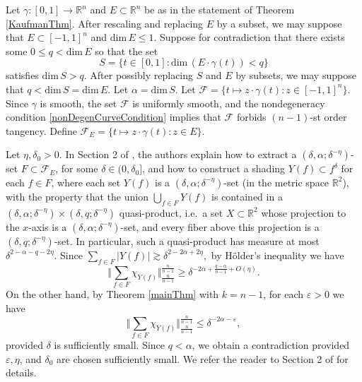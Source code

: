 \documentclass[letterpaper, reqno,11pt]{article}
\numberwithin{equation}{section}
\renewcommand{\dim}{\mathrm{dim}\,}
\newcommand{\RR}{\mathbb{R}}
\newcommand{\eps}{\varepsilon}
\numberwithin{thm}{section}
\theoremstyle{remark}
\begin{document}
Let $\gamma\colon[0,1]\to\RR^n$ and $E\subset\RR^n$ be as in the statement of Theorem \ref{KaufmanThm}. After rescaling and replacing $E$ by a subset, we may suppose that $E\subset[-1,1]^n$ and $\dim E\leq 1$. Suppose for contradiction that there exists some $0\leq q<\dim E$ so that the set
\[
S = \{t\in [0,1]\colon \dim(E\cdot\gamma(t))<q\}
\]
satisfies $\dim S>q$. After possibly replacing $S$ and $E$ by subsets, we may suppose that $q<\dim S = \dim E$. Let $\alpha= \dim S$. Let $\mathcal{F} = \{t\mapsto z\cdot \gamma(t)\colon z\in [-1,1]^n\}$. Since $\gamma$ is smooth, the set $\mathcal{F}$ is uniformly smooth, and the nondegeneracy condition \eqref{nonDegenCurveCondition} implies that $\mathcal{F}$ forbids $(n-1)$-st order tangency. Define $\mathcal{F}_E = \{t\mapsto z\cdot \gamma(t)\colon z\in E\}$.

Let $\eta,\delta_0>0$. In Section 2 of \cite{PYZ}, the authors explain how to extract a $(\delta, \alpha; \delta^{-\eta})$-set $F\subset\mathcal{F}_E$, for some $\delta\in(0,\delta_0]$, and how to construct a shading $Y(f)\subset f^\delta$ for each $f\in F$, where each set $Y(f)$ is a $(\delta,\alpha;\delta^{-\eta})$-set (in the metric space $\RR^2$), with the property that the union $\bigcup_{f\in F}Y(f)$ is contained in a $(\delta, \alpha; \delta^{-\eta})\times (\delta, q; \delta^{-\eta})$ quasi-product, i.e.~a set $X\subset\RR^2$ whose projection to the $x$-axis is a $(\delta, \alpha; \delta^{-\eta})$-set, and every fiber above this projection is a $(\delta, q; \delta^{-\eta})$-set. In particular, such a quasi-product has measure at most $\delta^{2-\alpha-q-2\eta}$. Since $\sum_{f\in F}|Y(f)|\gtrsim\delta^{2 - 2\alpha+2\eta},$ by H\"older's inequality we have
\begin{equation}\label{HolderLowerBd}
\Big\Vert \sum_{f\in F}\chi_{Y(f)} \Big\Vert_{\frac{n}{n-1}}^{\frac{n}{n-1}} \geq \delta^{-2\alpha + \frac{q-\alpha}{n-1}+O(\eta)}.
\end{equation}
On the other hand, by Theorem \ref{mainThm} with $k=n-1$, for each $\eps>0$ we have
\begin{equation}\label{consequenceOfMainThmMaximal}
\Big\Vert \sum_{f\in F}\chi_{Y(f)} \Big\Vert_{\frac{n}{n-1}}^{\frac{n}{n-1}} \leq \delta^{-2\alpha-\eps},
\end{equation}
provided $\delta$ is sufficiently small. Since $q<\alpha$, we obtain a contradiction provided $\eps,\eta$, and $\delta_0$ are chosen sufficiently small. We refer the reader to Section 2 of \cite{PYZ} for details. 
\end{document}
